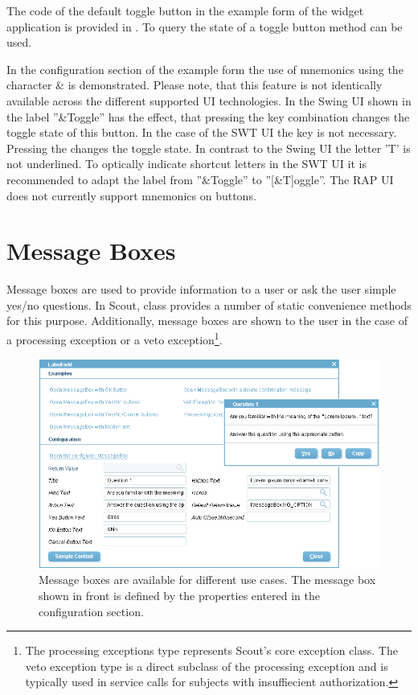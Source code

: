 \documentclass[a4paper,10pt,twoside]{book}
\begin{document}
The code of the default toggle button in the example form of the widget application is provided in . 
To query the state of a toggle button method  can be used. 

In the configuration section of the example form the use of mnemonics using the character \& is demonstrated. 
Please note, that this feature is not identically available across the different supported UI technologies. 
In the Swing UI shown in  the label ''\&Toggle'' has the effect, that pressing the  key combination changes the toggle state of this button. 
In the case of the SWT UI the  key is not necessary. 
Pressing the  changes the toggle state. 
In contrast to the Swing UI the letter 'T' is not underlined. 
To optically indicate shortcut letters in the SWT UI it is recommended to adapt the label from ''\&Toggle'' to ''[\&T]oggle''. 
The RAP UI does not currently support mnemonics on buttons. 

\section{Message Boxes}

Message boxes are used to provide information to a user or ask the user simple yes/no questions. 
In Scout, class  provides a number of static convenience methods for this purpose. 
Additionally, message boxes are shown to the user in the case of a processing exception or a veto exception\footnote{
The processing exceptions type  represents Scout's core exception class. 
The veto exception type  is a direct subclass of the processing exception and is typically used in service calls for subjects with insuffiecient authorization. 
}. 

\begin{figure}
\includegraphics[width=14cm]{messagebox.png}
\caption{Message boxes are available for different use cases.
The message box shown in front is defined by the properties entered in the configuration section.}
\end{figure}
\end{document}
